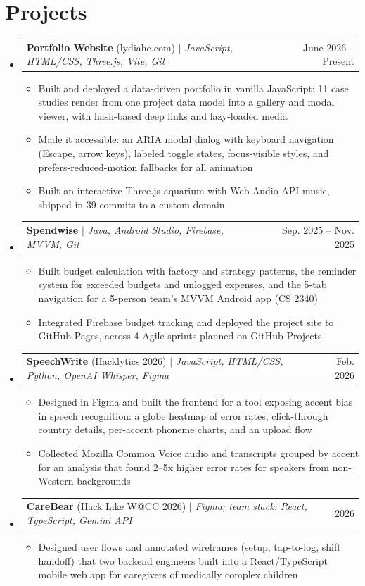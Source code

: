 \documentclass[letterpaper,11pt]{article}
\makeatletter
\newcommand{\resumeItem}[1]{
  \item\small{
    {#1 \vspace{-2pt}}
  }
}
\newcommand{\resumeProjectHeading}[2]{
    \item
    \begin{tabular*}{0.97\textwidth}{l@{\extracolsep{\fill}}r}
      \small#1 & #2 \\
    \end{tabular*}\vspace{-7pt}
}
\newcommand{\resumeSubHeadingListStart}{\begin{itemize}[leftmargin=0.15in, label={}]}
\newcommand{\resumeSubHeadingListEnd}{\end{itemize}}
\newcommand{\resumeItemListStart}{\begin{itemize}}
\newcommand{\resumeItemListEnd}{\end{itemize}\vspace{-5pt}}
\makeatother
\begin{document}
\section{Projects}
    \resumeSubHeadingListStart
      \resumeProjectHeading
          {\textbf{Portfolio Website} (lydiahe.com) $|$ \emph{JavaScript, HTML/CSS, Three.js, Vite, Git}}{June 2026 -- Present}
          \resumeItemListStart
            \resumeItem{Built and deployed a data-driven portfolio in vanilla JavaScript: 11 case studies render from one project data model into a gallery and modal viewer, with hash-based deep links and lazy-loaded media}
            \resumeItem{Made it accessible: an ARIA modal dialog with keyboard navigation (Escape, arrow keys), labeled toggle states, focus-visible styles, and prefers-reduced-motion fallbacks for all animation}
            \resumeItem{Built an interactive Three.js aquarium with Web Audio API music, shipped in 39 commits to a custom domain}
          \resumeItemListEnd
      \resumeProjectHeading
          {\textbf{Spendwise} $|$ \emph{Java, Android Studio, Firebase, MVVM, Git}}{Sep. 2025 -- Nov. 2025}
          \resumeItemListStart
            \resumeItem{Built budget calculation with factory and strategy patterns, the reminder system for exceeded budgets and unlogged expenses, and the 5-tab navigation for a 5-person team's MVVM Android app (CS 2340)}
            \resumeItem{Integrated Firebase budget tracking and deployed the project site to GitHub Pages, across 4 Agile sprints planned on GitHub Projects}
          \resumeItemListEnd
      \resumeProjectHeading
          {\textbf{SpeechWrite} (Hacklytics 2026) $|$ \emph{JavaScript, HTML/CSS, Python, OpenAI Whisper, Figma}}{Feb. 2026}
          \resumeItemListStart
            \resumeItem{Designed in Figma and built the frontend for a tool exposing accent bias in speech recognition: a globe heatmap of error rates, click-through country details, per-accent phoneme charts, and an upload flow}
            \resumeItem{Collected Mozilla Common Voice audio and transcripts grouped by accent for an analysis that found 2--5x higher error rates for speakers from non-Western backgrounds}
          \resumeItemListEnd
      \resumeProjectHeading
          {\textbf{CareBear} (Hack Like W@CC 2026) $|$ \emph{Figma; team stack: React, TypeScript, Gemini API}}{2026}
          \resumeItemListStart
            \resumeItem{Designed user flows and annotated wireframes (setup, tap-to-log, shift handoff) that two backend engineers built into a React/TypeScript mobile web app for caregivers of medically complex children}
          \resumeItemListEnd
    \resumeSubHeadingListEnd
\end{document}
